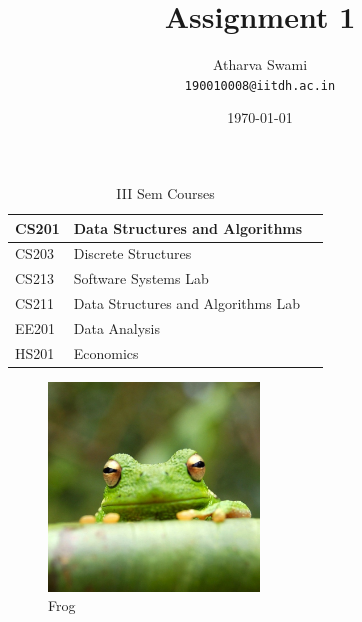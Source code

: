 \documentclass[12pt]{article}%
\title{Assignment 1}
\author[1]{Atharva Swami\\
\texttt{190010008@iitdh.ac.in}}
\affil[1]{CSE, IIT Dharwad}
\date{\today}
\begin{document}
\maketitle

\tableofcontents
\listoffigures
\listoftables

\newpage
\begin{table}
    \centering
    \begin{tabularx}{0.9\textwidth} { 
  | >{\raggedright\arraybackslash}X 
  | >{\centering\arraybackslash}X 
  | >{\raggedleft\arraybackslash}X | }
 \hline
 CS201 & Data Structures and Algorithms \\
 \hline
 CS203  & Discrete Structures  \\
\hline
CS213  & Software Systems Lab  \\
\hline
CS211  & Data Structures and Algorithms Lab  \\
\hline
EE201  & Data Analysis  \\
\hline
HS201  & Economics  \\
\hline
\end{tabularx}
    \caption{III Sem Courses}
    \label{tab:my_label}
\end{table}

\begin{figure}
    \centering
    \includegraphics[width=0.5\textwidth]{frog.jpg}
    \caption{Frog}
    \label{fig:my_label}
\end{figure}

\end{document}
